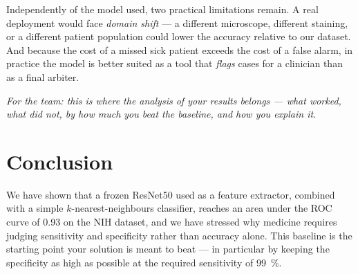 \documentclass[11pt]{article}
\newcommand{\knnAUC}{0.93}
\begin{document}
Independently of the model used, two practical limitations remain. A real deployment would face
\emph{domain shift} --- a different microscope, different staining, or a different patient
population could lower the accuracy relative to our dataset. And because the cost of a missed
sick patient exceeds the cost of a false alarm, in practice the model is better suited as a tool
that \emph{flags} cases for a clinician than as a final arbiter.

\medskip\noindent\textit{For the team: this is where the analysis of your results belongs --- what
worked, what did not, by how much you beat the baseline, and how you explain it.}

\section{Conclusion}
\label{sec:conclusion}

We have shown that a frozen ResNet50 used as a feature extractor, combined with a simple
$k$-nearest-neighbours classifier, reaches an area under the ROC curve of \knnAUC{} on the NIH
dataset, and we have stressed why medicine requires judging sensitivity and specificity rather
than accuracy alone. This baseline is the starting point your solution is meant to beat ---
in particular by keeping the specificity as high as possible at the required sensitivity of 99~\%.



\end{document}

